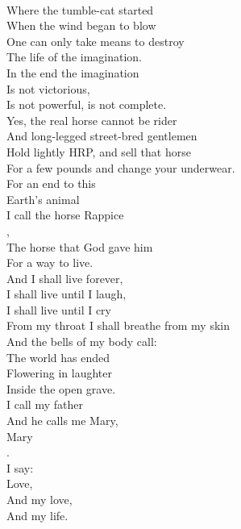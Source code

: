 \documentclass[smalldemyvopaper,11pt,twoside,onecolumn,openright,extrafontsizes]{memoir}
\begin{document}
\\Where the tumble-cat started
\\When the wind began to blow
\\One can only take means to destroy
\\The life of the imagination.
\\In the end the imagination
\\Is not victorious,
\\Is not powerful, is not complete.
\\Yes, the real horse cannot be rider
\\And long-legged street-bred gentlemen
\\Hold lightly HRP, and sell that horse
\\For a few pounds and change your underwear.
\\For an end to this
\\Earth's animal
\\I call the horse Rappice
\\,
\\The horse that God gave him
\\For a way to live.
\\And I shall live forever,
\\I shall live until I laugh,
\\I shall live until I cry
\\From my throat I shall breathe from my skin
\\And the bells of my body call:
\\The world has ended
\\Flowering in laughter
\\Inside the open grave.
\\I call my father
\\And he calls me Mary,
\\Mary
\\.
\\I say:
\\Love,
\\And my love,
\\And my life.
\end{document}
